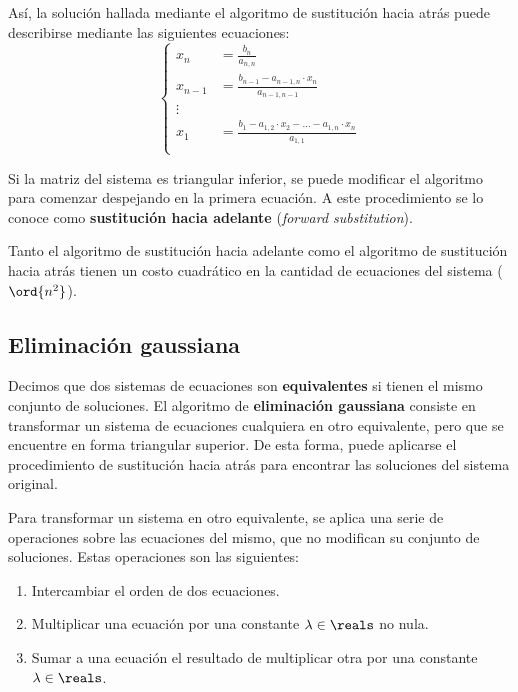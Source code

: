 Así, la solución hallada mediante el algoritmo de sustitución hacia atrás
puede describirse mediante las siguientes ecuaciones:
\[ \left\lbrace \begin{aligned}
    x_{n} &= \frac{b_{n}}{a_{n,n}} \\
    x_{n-1} &= \frac{b_{n-1} - a_{n-1,n}\cdot x_{n}}{a_{n-1,n-1}} \\
    \vdots \\
    x_{1} &= \frac{b_{1} - a_{1,2}\cdot x_{2} - \dots - a_{1,n}\cdot x_{n}}{a_{1,1}} \\
\end{aligned} \right. \]

Si la matriz del sistema es triangular inferior, se puede modificar el
algoritmo para comenzar despejando en la primera ecuación. A este
procedimiento se lo conoce como \textbf{sustitución hacia adelante}
(\emph{forward substitution}).

Tanto el algoritmo de sustitución hacia adelante como el algoritmo de
sustitución hacia atrás tienen un costo cuadrático en la cantidad de
ecuaciones del sistema ($\ord{n^2}$).

\subsection{Eliminación gaussiana}

Decimos que dos sistemas de ecuaciones son \textbf{equivalentes} si tienen el
mismo conjunto de soluciones. El algoritmo de \textbf{eliminación gaussiana}
consiste en transformar un sistema de ecuaciones cualquiera en otro
equivalente, pero que se encuentre en forma triangular superior. De esta
forma,
puede aplicarse el procedimiento de sustitución hacia atrás para encontrar
las soluciones del sistema original.

Para transformar un sistema en otro equivalente, se aplica una serie de
operaciones sobre las ecuaciones del mismo, que no modifican su conjunto
de soluciones. Estas operaciones son las siguientes:
\begin{enumerate}[label=(\arabic*),itemsep=0em]
\item Intercambiar el orden de dos ecuaciones.
\item Multiplicar una ecuación por una constante $\lambda \in \reals$ no nula.
\item Sumar a una ecuación el resultado de multiplicar otra por una constante
$\lambda \in \reals$.
\end{enumerate}

